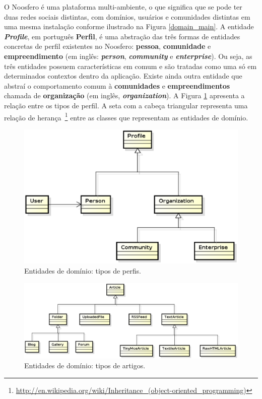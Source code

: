 O Noosfero é uma plataforma multi-ambiente, o que significa que se pode ter duas
redes sociais distintas, com domínios, usuários e comunidades distintas em uma
mesma instalação conforme ilustrado na Figura \ref{domain_main}.
%
A entidade \textbf{\textit{Profile}}, em português \textbf{Perfil}, é uma
abstração das três formas de entidades concretas de perfil existentes no
Noosfero: \textbf{pessoa}, \textbf{comunidade} e \textbf{empreendimento}
(em inglês: \textbf{\textit{person}}, \textbf{\textit{community}} e
\textbf{\textit{enterprise}}).
%
Ou seja, as três entidades possuem características em comum e são tratadas
como uma só em determinados contextos dentro da aplicação. Existe ainda
outra entidade que abstraí o comportamento comum à \textbf{comunidades}
e \textbf{empreendimentos} chamada de \textbf{organização} (em inglês,
\textbf{\textit{organization}}).
%
A Figura \ref{domain_profiles} apresenta a relação entre os tipos de perfil.
A seta com a cabeça triangular representa uma relação de herança~\footnote{%
\url{http://en.wikipedia.org/wiki/Inheritance_(object-oriented_programming)}}
entre as classes que representam as entidades de domínio.

\begin{figure}[h!]
	\centering
	\includegraphics[keepaspectratio=true,scale=0.6]
	  {figuras/domain_profiles.eps}
	\caption{Entidades de domínio: tipos de perfis.}
	\label{domain_profiles}
\end{figure}

\begin{figure}[h!]
	\centering
	\includegraphics[keepaspectratio=true,scale=0.55]
	  {figuras/domain_articles.eps}
	\caption{Entidades de domínio: tipos de artigos.}
	\label{domain_articles}
\end{figure}

